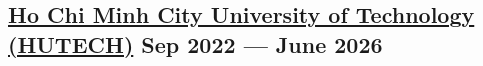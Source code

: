 
\subsection{{\href{https://www.hutech.edu.vn}{Ho Chi Minh City University of Technology (HUTECH)} \hfill Sep 2022 --- June 2026}}
\begin{null}

\end{null}
